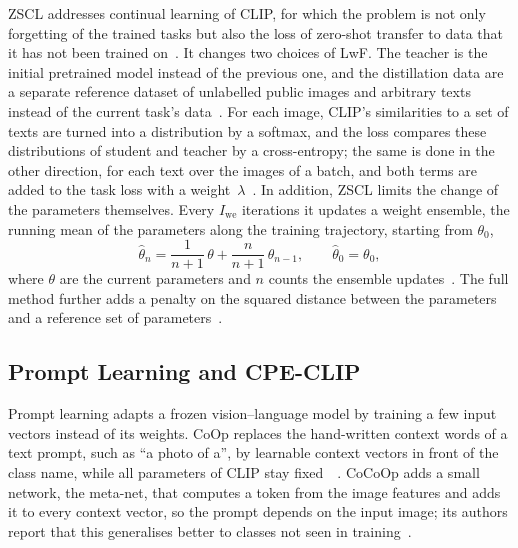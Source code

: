 ZSCL addresses continual learning of CLIP, for which the problem is not only forgetting of the trained tasks but also the loss of zero-shot transfer to data that it has not been trained on~\cite[Sec.~1]{zheng2023preventingzeroshottransferdegradation}.
It changes two choices of LwF.
The teacher is the initial pretrained model instead of the previous one, and the distillation data are a separate reference dataset of unlabelled public images and arbitrary texts instead of the current task's data~\cite[Sec.~3.2]{zheng2023preventingzeroshottransferdegradation}.
For each image, CLIP's similarities to a set of texts are turned into a distribution by a softmax, and the loss compares these distributions of student and teacher by a cross-entropy; the same is done in the other direction, for each text over the images of a batch, and both terms are added to the task loss with a weight~$\lambda$~\cite[Sec.~3.2, Eqs.~2--4]{zheng2023preventingzeroshottransferdegradation}.
In addition, ZSCL limits the change of the parameters themselves.
Every $I_{\mathrm{we}}$ iterations it updates a weight ensemble, the running mean of the parameters along the training trajectory, starting from $\theta_0$,
\begin{equation}
\hat{\theta}_n = \frac{1}{n+1}\,\theta + \frac{n}{n+1}\,\hat{\theta}_{n-1}, \qquad \hat{\theta}_0 = \theta_0,
\label{eq:bg-we}
\end{equation}
where $\theta$ are the current parameters and $n$ counts the ensemble updates~\cite[Sec.~3.3, Eq.~7]{zheng2023preventingzeroshottransferdegradation}.
The full method further adds a penalty on the squared distance between the parameters and a reference set of parameters~\cite[Sec.~3.3, Eq.~5, Table~2]{zheng2023preventingzeroshottransferdegradation}.

\subsection{Prompt Learning and CPE-CLIP}
\label{subsec:bg-prompt}

Prompt learning adapts a frozen vision--language model by training a few input vectors instead of its weights.
CoOp replaces the hand-written context words of a text prompt, such as ``a photo of a'', by learnable context vectors in front of the class name, while all parameters of CLIP stay fixed~\cite{zhou2022coop}~\cite[Sec.~3.2]{zhou2022cocoop}.
CoCoOp adds a small network, the meta-net, that computes a token from the image features and adds it to every context vector, so the prompt depends on the input image; its authors report that this generalises better to classes not seen in training~\cite[Sec.~3.3, 4.1]{zhou2022cocoop}.

